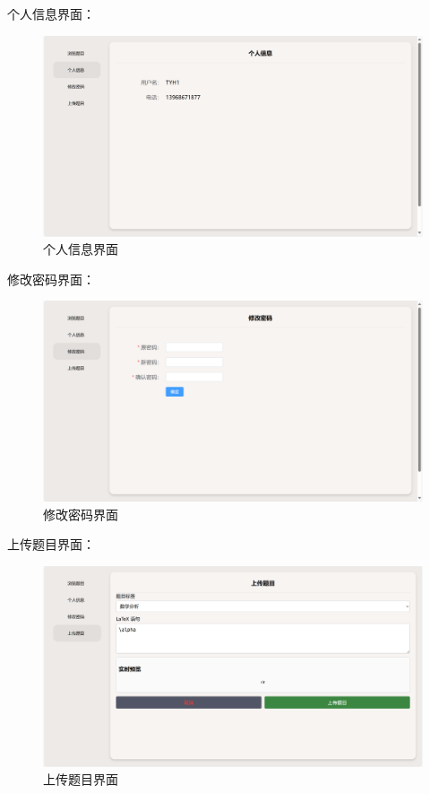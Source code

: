 \documentclass[a4paper,AutoFakeBold={2.7}]{ctexart} %
\begin{document}
个人信息界面：

\begin{figure}[H]
	\centering
	\includegraphics[width=\linewidth]{./图片/个人信息界面.png}
	\caption{个人信息界面}\label{个人信息界面}
\end{figure}

修改密码界面：

\begin{figure}[H]
	\centering
	\includegraphics[width=\linewidth]{./图片/修改密码界面.png}
	\caption{修改密码界面}\label{修改密码界面}
\end{figure}

上传题目界面：

\begin{figure}[H]
	\centering
	\includegraphics[width=\linewidth]{./图片/上传题目界面.png}
	\caption{上传题目界面}\label{上传题目界面}
\end{figure}
\end{document}
